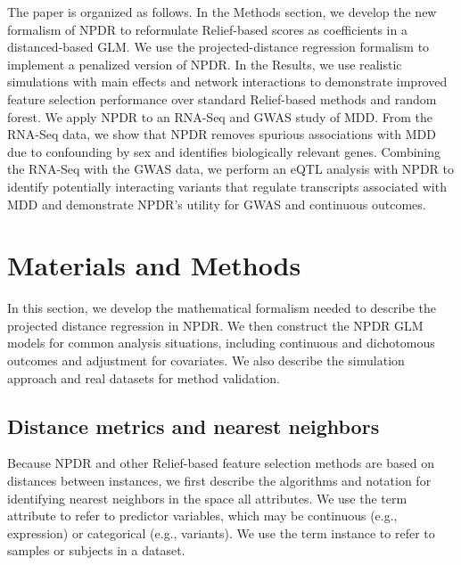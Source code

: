 \documentclass[10pt]{article}
\begin{document}
The paper is organized as follows.
In the Methods section, we develop the new formalism of NPDR to reformulate Relief-based scores as coefficients in a distanced-based GLM.
We use the projected-distance regression formalism to implement a penalized version of NPDR.
In the Results, we use realistic simulations with main effects and network interactions to demonstrate improved feature selection performance over standard Relief-based methods and random forest.
We apply NPDR to an RNA-Seq and GWAS study of MDD.
From the RNA-Seq data, we show that NPDR removes spurious associations with MDD due to confounding by sex and identifies biologically relevant genes.
Combining the RNA-Seq with the GWAS data, we perform an eQTL analysis with NPDR to identify potentially interacting variants that regulate transcripts associated with MDD and demonstrate NPDR's utility for GWAS and continuous outcomes.



\section{Materials and Methods}
In this section, we develop the mathematical formalism needed to describe the projected distance regression in NPDR.
We then construct the NPDR GLM models for common analysis situations, including continuous and dichotomous outcomes and adjustment for covariates.
We also describe the simulation approach and real datasets for method validation.

\def\ri{R_i}
\def\rj{R_j}
\def\kmi{k_{M_i}}
\def\khi{k_{H_i}}
\def\hji{H_{j_i}}
\def\ma{\overline{M}_a}
\def\ha{\overline{H}_a}
\def\mnu{M_\nu}
\def\hnu{H_\nu}
\def\myd{\text{diff}}
\def\ka{\bar{k}_\alpha}

\subsection{Distance metrics and nearest neighbors}\label{sec:reform}
Because NPDR and other Relief-based feature selection methods are based on distances between instances, we first describe the algorithms and notation for identifying nearest neighbors in the space all attributes.
We use the term attribute to refer to predictor variables, which may be continuous (e.g., expression) or categorical (e.g., variants).
We use the term instance to refer to samples or subjects in a dataset.
\end{document}

